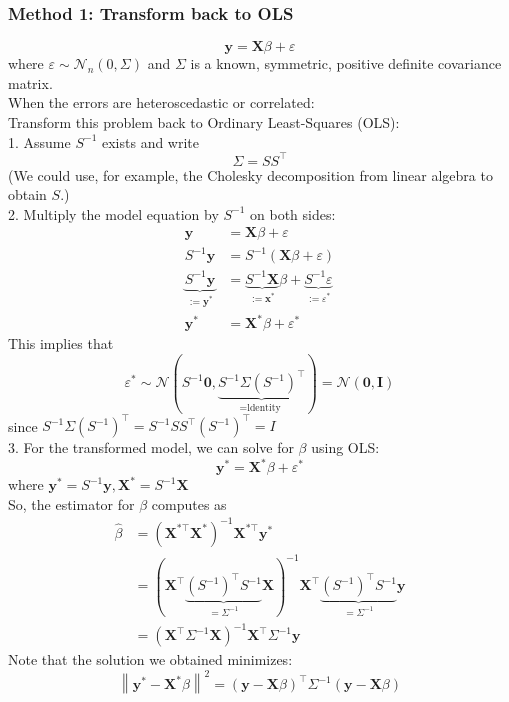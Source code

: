 \documentclass[11pt,a4paper]{article}
\begin{document}
\subsubsection{Method 1: Transform back to OLS}
$$
\mathbf{y}=\mathbf{X} \beta+\varepsilon
$$
where $\varepsilon \sim \mathcal{N}_{n}(0, \Sigma)$ and $\Sigma$ is a known, symmetric, positive definite covariance matrix.\\
When the errors are heteroscedastic or correlated:\\
Transform this problem back to Ordinary Least-Squares (OLS):\\
1. Assume $S^{-1}$ exists and write
$$
\Sigma=S S^{\top}
$$
(We could use, for example, the Cholesky decomposition from linear algebra to obtain $S$.)\\

2. Multiply the model equation by $S^{-1}$ on both sides:
$$
\begin{aligned}
\mathbf{y} &=\mathbf{X} \beta+\varepsilon \\
S^{-1} \mathbf{y} &=S^{-1}(\mathbf{X} \beta+\varepsilon) \\
\underbrace{S^{-1} \mathbf{y}}_{:=\mathbf{y}^{*}} &=\underbrace{S^{-1} \mathbf{X}}_{:=\mathbf{x}^{*}} \beta+\underbrace{S^{-1} \varepsilon}_{:=\varepsilon^{*}} \\
\mathbf{y}^{*} &=\mathbf{X}^{*} \beta+\varepsilon^{*}
\end{aligned}
$$
This implies that
$$
\varepsilon^{*} \sim \mathcal{N}(S^{-1} \mathbf{0}, \underbrace{S^{-1} \Sigma\left(S^{-1}\right)^{\top}}_{=\text {ldentity }})=\mathcal{N}(\mathbf{0}, \mathbf{I})
$$
since $S^{-1} \Sigma\left(S^{-1}\right)^{\top}=S^{-1} S S^{\top}\left(S^{-1}\right)^{\top}=I$\\

3. For the transformed model, we can solve for $\beta$ using OLS:
$$
\mathbf{y}^{*}=\mathbf{X}^{*} \beta+\varepsilon^{*}
$$
where $\mathbf{y}^{*}=S^{-1} \mathbf{y}, \mathbf{X}^{*}=S^{-1} \mathbf{X}$\\
So, the estimator for $\beta$ computes as
$$
\begin{aligned}
\hat{\beta} &=\left(\mathbf{X}^{* \top} \mathbf{X}^{*}\right)^{-1} \mathbf{X}^{* \top} \mathbf{y}^{*} \\
&=(\mathbf{X}^{\top} \underbrace{\left(S^{-1}\right)^{\top} S^{-1}}_{=\Sigma^{-1}} \mathbf{X})^{-1} \mathbf{X}^{\top} \underbrace{\left(S^{-1}\right)^{\top} S^{-1}}_{=\Sigma^{-1}} \mathbf{y} \\
&=\left(\mathbf{X}^{\top} \Sigma^{-1} \mathbf{X}\right)^{-1} \mathbf{X}^{\top} \Sigma^{-1} \mathbf{y}
\end{aligned}
$$
Note that the solution we obtained minimizes:
$$
\left\|\mathbf{y}^{*}-\mathbf{X}^{*} \beta\right\|^{2}=(\mathbf{y}-\mathbf{X} \beta)^{\top} \Sigma^{-1}(\mathbf{y}-\mathbf{X} \beta)
$$
\end{document}
